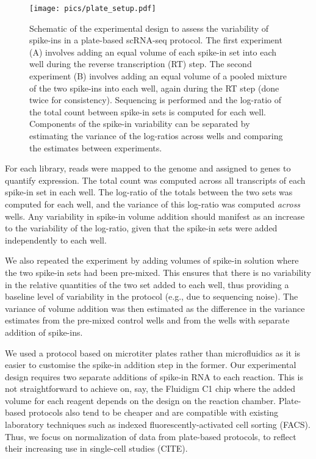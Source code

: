 \documentclass{article}
\begin{document}
\begin{figure}[tbp]
\begin{center}
\texttt{[image: pics/plate\_setup.pdf]}
\end{center}
\caption{Schematic of the experimental design to assess the variability of spike-ins in a plate-based scRNA-seq protocol.
The first experiment (A) involves adding an equal volume of each spike-in set into each well during the reverse transcription (RT) step.
The second experiment (B) involves adding an equal volume of a pooled mixture of the two spike-ins into each well, again during the RT step (done twice for consistency).
Sequencing is performed and the log-ratio of the total count between spike-in sets is computed for each well.
Components of the spike-in variability can be separated by estimating the variance of the log-ratios across wells and comparing the estimates between experiments.
}
\label{fig:expdesign}
\end{figure}

For each library, reads were mapped to the genome and assigned to genes to quantify expression.
The total count was computed across all transcripts of each spike-in set in each well.
The log-ratio of the totals between the two sets was computed for each well, and the variance of this log-ratio was computed \textit{across} wells.
Any variability in spike-in volume addition should manifest as an increase to the variability of the log-ratio, given that the spike-in sets were added independently to each well.

We also repeated the experiment by adding volumes of spike-in solution where the two spike-in sets had been pre-mixed.
This ensures that there is no variability in the relative quantities of the two set added to each well, thus providing a baseline level of variability in the protocol (e.g., due to 
sequencing noise).
The variance of volume addition was then estimated as the difference in the variance estimates from the pre-mixed control wells and from the wells with separate addition of spike-ins.

We used a protocol based on microtiter plates rather than microfluidics as it is easier to customise the spike-in addition step in the former.
Our experimental design requires two separate additions of spike-in RNA to each reaction.
This is not straightforward to achieve on, say, the Fluidigm C1 chip where the added volume for each reagent depends on the design on the reaction chamber.
Plate-based protocols also tend to be cheaper and are compatible with existing laboratory techniques such as indexed fluorescently-activated cell sorting (FACS).
Thus, we focus on normalization of data from plate-based protocols, to reflect their increasing use in single-cell studies (CITE).
\end{document}
